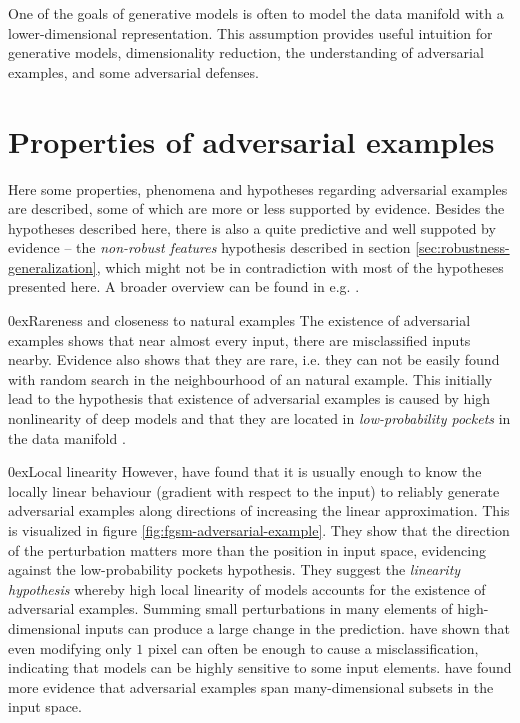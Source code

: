 \documentclass[conference,compsoc]{IEEEtran}
\makeatletter
\def\paragraph{\@startsection{paragraph}{4}{\z@}{1.5ex plus 1.5ex minus 0.5ex}%
{0ex}{\bfseries}}
\makeatother
\begin{document}
One of the goals of generative models is often to model the data manifold with a lower-dimensional representation. This assumption provides useful intuition for generative models, dimensionality reduction, the understanding of adversarial examples, and some adversarial defenses.


\section{Properties of adversarial examples}

Here some properties, phenomena and hypotheses regarding adversarial examples are described, some of which are more or less supported by evidence. Besides the hypotheses described here, there is also a quite predictive and well suppoted by evidence -- the \textit{non-robust features} hypothesis \citep{Ilyas:2019:AENBTF,Tsipras:2018:RMBOA} described in section \ref{sec:robustness-generalization}, which might not be in contradiction with most of the hypotheses presented here. A broader overview can be found in e.g. \citet{Serban:2018:AECCP}.

\paragraph{Rareness and closeness to natural examples} The existence of adversarial examples shows that near almost every input, there are misclassified inputs nearby. Evidence also shows that they are rare, i.e. they can not be easily found with random search in the neighbourhood of an natural example. This initially lead to the hypothesis that existence of adversarial examples is caused by high nonlinearity of deep models and that they are located in \textit{low-probability pockets} in the data manifold \citep{Szegedy:2013:IPNN}. 

\paragraph{Local linearity} However, \citet{Goodfellow:2014:EHAE} have found that it is usually enough to know the locally linear behaviour (gradient with respect to the input) to reliably generate adversarial examples along directions of increasing the linear approximation. This is visualized in figure \ref{fig:fgsm-adversarial-example}. They show that the direction of the perturbation matters more than the position in input space, evidencing against the low-probability pockets hypothesis. They suggest the \textit{linearity hypothesis} whereby high local linearity of models accounts for the existence of adversarial examples. Summing small perturbations in many elements of high-dimensional inputs can produce a large change in the prediction. \citet{Su:2017:OPAFDNN} have shown that even modifying only $1$ pixel can often be enough to cause a misclassification, indicating that models can be highly sensitive to some input elements. \citet{Tabacof:2016:ESAI} have found more evidence that adversarial examples span many-dimensional subsets in the input space.
\end{document}
